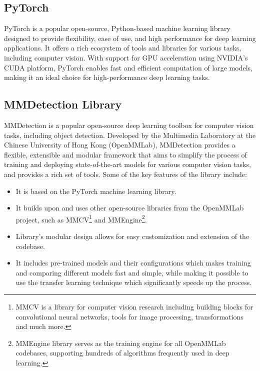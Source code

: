 \subsection{PyTorch}

PyTorch \cite{PyTorch} is a popular open-source, Python-based machine learning
library designed to provide flexibility, ease of use, and high performance for
deep learning applications. It offers a rich ecosystem of tools and libraries for
various tasks, including computer vision. With support for GPU acceleration
using NVIDIA's CUDA platform, PyTorch enables fast and efficient computation of
large models, making it an ideal choice for high-performance deep learning
tasks.

\subsection{MMDetection Library}

MMDetection \cite{MMDetection} is a popular open-source deep learning toolbox
for computer vision tasks, including object detection. Developed by the
Multimedia Laboratory at the Chinese University of Hong Kong (OpenMMLab),
MMDetection provides a flexible, extensible and modular framework that aims to
simplify the process of training and deploying state-of-the-art models for
various computer vision tasks, and provides a rich set of tools. Some of the key
features of the library include:

\begin{itemize}
    \item It is based on the PyTorch machine learning library.
    \item It builds upon and uses other open-source libraries from the OpenMMLab
    project, such as MMCV\footnote{MMCV is a library for computer vision
    research including building blocks for convolutional neural networks, tools
    for image processing, transformations and much more.} and
    MMEngine\footnote{MMEngine library serves as the training engine for all
    OpenMMLab codebases, supporting hundreds of algorithms frequently used in
    deep learning.}.
    \item Library's modular design allows for easy customization and extension
    of the codebase.
    \item It includes pre-trained models and their configurations which makes
    training and comparing different models fast and simple, while making it
    possible to use the transfer learning technique which significantly speeds up the
    process.
\end{itemize}


